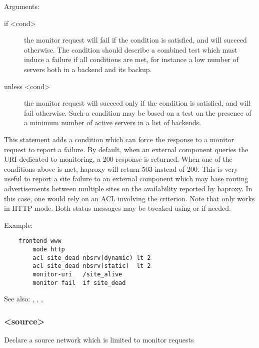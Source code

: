   Arguments:
\begin{description}
\item[if <cond>]
                  the monitor request will fail if the condition is satisfied,
                  and will succeed otherwise. The condition should describe a
                  combined test which must induce a failure if all conditions
                  are met, for instance a low number of servers both in a
                  backend and its backup.

\item[unless <cond>]
                  the monitor request will succeed only if the condition is
                  satisfied, and will fail otherwise. Such a condition may be
                  based on a test on the presence of a minimum number of active
                  servers in a list of backends.
\end{description}

  This statement adds a condition which can force the response to a monitor
  request to report a failure. By default, when an external component queries
  the URI dedicated to monitoring, a 200 response is returned. When one of the
  conditions above is met, haproxy will return 503 instead of 200. This is
  very useful to report a site failure to an external component which may base
  routing advertisements between multiple sites on the availability reported by
  haproxy. In this case, one would rely on an ACL involving the 
  criterion. Note that  only works in HTTP mode. Both status
  messages may be tweaked using  or  if needed.

  Example:
 \begin{verbatim}
    frontend www
        mode http
        acl site_dead nbsrv(dynamic) lt 2
        acl site_dead nbsrv(static)  lt 2
        monitor-uri   /site_alive
        monitor fail  if site_dead
\end{verbatim}

  See also: , , , 

\subsubsection[monitor-net]{ <source>}

  Declare a source network which is limited to monitor requests



